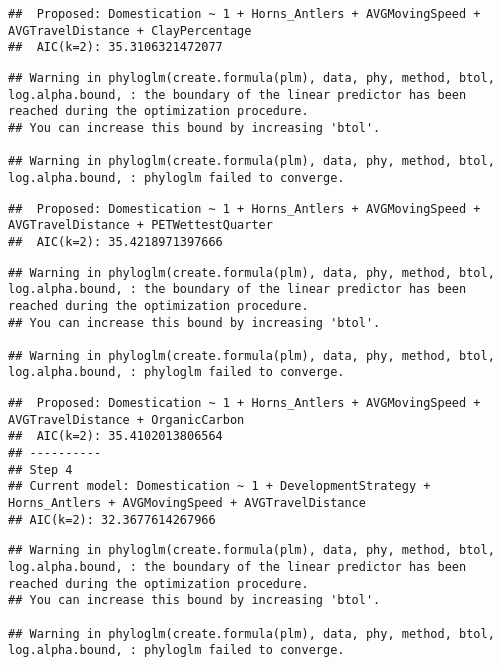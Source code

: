 \documentclass[
]{article}
\begin{document}
\begin{verbatim}
##  Proposed: Domestication ~ 1 + Horns_Antlers + AVGMovingSpeed + AVGTravelDistance + ClayPercentage
##  AIC(k=2): 35.3106321472077
\end{verbatim}

\begin{verbatim}
## Warning in phyloglm(create.formula(plm), data, phy, method, btol, log.alpha.bound, : the boundary of the linear predictor has been reached during the optimization procedure.
## You can increase this bound by increasing 'btol'.

## Warning in phyloglm(create.formula(plm), data, phy, method, btol, log.alpha.bound, : phyloglm failed to converge.
\end{verbatim}

\begin{verbatim}
##  Proposed: Domestication ~ 1 + Horns_Antlers + AVGMovingSpeed + AVGTravelDistance + PETWettestQuarter
##  AIC(k=2): 35.4218971397666
\end{verbatim}

\begin{verbatim}
## Warning in phyloglm(create.formula(plm), data, phy, method, btol, log.alpha.bound, : the boundary of the linear predictor has been reached during the optimization procedure.
## You can increase this bound by increasing 'btol'.

## Warning in phyloglm(create.formula(plm), data, phy, method, btol, log.alpha.bound, : phyloglm failed to converge.
\end{verbatim}

\begin{verbatim}
##  Proposed: Domestication ~ 1 + Horns_Antlers + AVGMovingSpeed + AVGTravelDistance + OrganicCarbon
##  AIC(k=2): 35.4102013806564
## ----------
## Step 4
## Current model: Domestication ~ 1 + DevelopmentStrategy + Horns_Antlers + AVGMovingSpeed + AVGTravelDistance
## AIC(k=2): 32.3677614267966
\end{verbatim}

\begin{verbatim}
## Warning in phyloglm(create.formula(plm), data, phy, method, btol, log.alpha.bound, : the boundary of the linear predictor has been reached during the optimization procedure.
## You can increase this bound by increasing 'btol'.

## Warning in phyloglm(create.formula(plm), data, phy, method, btol, log.alpha.bound, : phyloglm failed to converge.
\end{verbatim}
\end{document}
